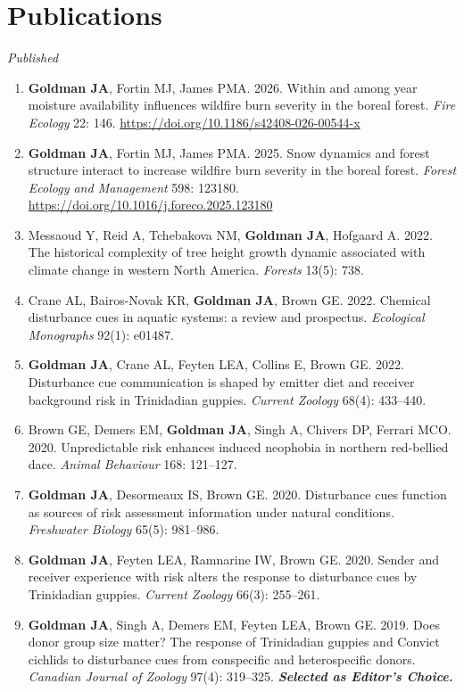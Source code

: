 \documentclass[11pt]{article}
\makeatletter
\newcommand{\revnum}[1]{\expandafter\@revnum\csname c@#1\endcsname}
\newcommand{\@revnum}[1]{\number\numexpr\totvalue{pubtotal}+1-#1\relax}
\newcommand{\me}[1]{\textbf{#1}}                         %
\newcommand{\sub}[1]{\par\vspace{4pt}\textit{#1}\par\nopagebreak\vspace{1pt}\nopagebreak}
\makeatother
\begin{document}
\section{Publications}
\sub{Published}
\begin{enumerate}[label=\revnum*.]
  \item \me{Goldman JA}, Fortin MJ, James PMA. 2026. Within and among year moisture availability influences wildfire burn severity in the boreal forest. \textit{Fire Ecology} 22: 146. \url{https://doi.org/10.1186/s42408-026-00544-x}
  \item \me{Goldman JA}, Fortin MJ, James PMA. 2025. Snow dynamics and forest structure interact to increase wildfire burn severity in the boreal forest. \textit{Forest Ecology and Management} 598: 123180. \url{https://doi.org/10.1016/j.foreco.2025.123180}
  \item Messaoud Y, Reid A, Tchebakova NM, \me{Goldman JA}, Hofgaard A. 2022. The historical complexity of tree height growth dynamic associated with climate change in western North America. \textit{Forests} 13(5): 738.
  \item Crane AL, Bairos-Novak KR, \me{Goldman JA}, Brown GE. 2022. Chemical disturbance cues in aquatic systems: a review and prospectus. \textit{Ecological Monographs} 92(1): e01487.
  \item \me{Goldman JA}, Crane AL, Feyten LEA, Collins E, Brown GE. 2022. Disturbance cue communication is shaped by emitter diet and receiver background risk in Trinidadian guppies. \textit{Current Zoology} 68(4): 433--440.
  \item Brown GE, Demers EM, \me{Goldman JA}, Singh A, Chivers DP, Ferrari MCO. 2020. Unpredictable risk enhances induced neophobia in northern red-bellied dace. \textit{Animal Behaviour} 168: 121--127.
  \item \me{Goldman JA}, Desormeaux IS, Brown GE. 2020. Disturbance cues function as sources of risk assessment information under natural conditions. \textit{Freshwater Biology} 65(5): 981--986.
  \item \me{Goldman JA}, Feyten LEA, Ramnarine IW, Brown GE. 2020. Sender and receiver experience with risk alters the response to disturbance cues by Trinidadian guppies. \textit{Current Zoology} 66(3): 255--261.
  \item \me{Goldman JA}, Singh A, Demers EM, Feyten LEA, Brown GE. 2019. Does donor group size matter? The response of Trinidadian guppies and Convict cichlids to disturbance cues from conspecific and heterospecific donors. \textit{Canadian Journal of Zoology} 97(4): 319--325. \textbf{\textit{Selected as Editor's Choice.}}
  \setcounter{pubtotal}{\value{enumi}}
\end{enumerate}
\end{document}

